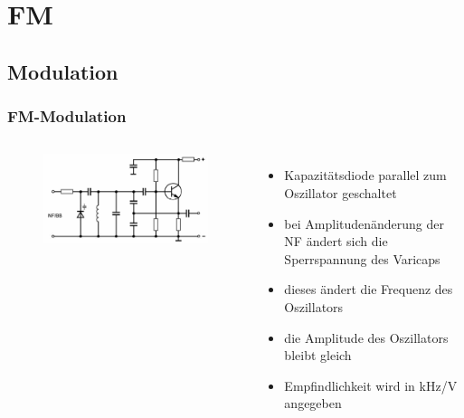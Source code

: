 \section{FM}

\subsection{Modulation}

\begin{frame}
  \frametitle{FM-Modulation}

  \begin{columns}
    \begin{figure}
      \includegraphics[width=\textwidth,height=.85\textheight,keepaspectratio]{a12/td514.png}
    \end{figure}
    \begin{itemize}
      \item Kapazitätsdiode parallel zum Oszillator geschaltet
      \item bei Amplitudenänderung der NF ändert sich die Sperrspannung des Varicaps
      \item dieses ändert die Frequenz des Oszillators
      \item die Amplitude des Oszillators bleibt gleich
      \item Empfindlichkeit wird in kHz/V angegeben
    \end{itemize}
  \end{columns}
\end{frame}

